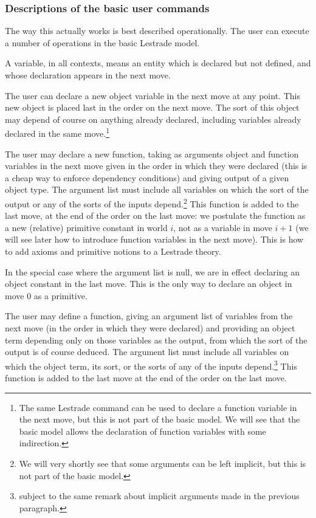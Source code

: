 \documentclass{article}
\begin{document}
\subsubsection{Descriptions of the basic user commands}

The way this actually works is best described operationally.   The user can execute a number of operations in the basic Lestrade model.

A variable, in all contexts, means an entity which is declared but not defined, and whose declaration appears in the next move.

The user can declare a new object variable in the next move at any point.  This new object is placed last in the order on the next move.   The sort of this object may depend of course on anything already declared, including variables already declared in the same move.\footnote{The same Lestrade command can be used to declare a function variable in the next move, but this is not part of the basic model.  We will see that the basic model allows the declaration of function variables with some indirection.}

The user may declare a new function, taking as arguments object and function variables in the next move given in the order in which they were declared 
(this is a cheap way to enforce dependency conditions) and giving output of a given object type.  The argument list must include all variables on which the sort of the output or any of the sorts of the inputs depend.\footnote{We will very shortly see that some arguments can be left implicit, but this is not part of the basic model.}  This function is added to the last move, at the end of the order on the last move:  we postulate the function as a new (relative) primitive constant in world $i$, not as a variable in move $i+1$ (we will see later how to introduce function variables in the next move).  This is how to add axioms and primitive notions to a Lestrade theory.

In the special case where the argument list is null, we are in effect declaring an object constant in the last move.  This is the only way to declare an object in move 0 as a primitive.

The user may define a function, giving an argument list of variables from the next move (in the order in which they were declared) and providing an object term depending only on those variables as the output, from which the sort of the output is of course deduced.  The argument list must include all variables on which the object term, its sort, or the sorts of any of the inputs depend.\footnote{subject to the same remark about implicit arguments made in the previous paragraph.}  This function is added to the last move at the end of the order on the last move.  
\end{document}
